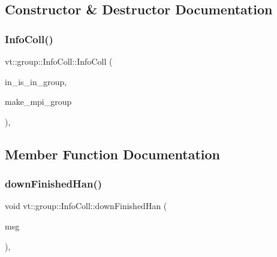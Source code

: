 \subsection{Constructor \& Destructor Documentation}
\mbox{\label{structvt_1_1group_1_1_info_coll_a289ba2942b64013eabc552e2fe362b0a}} 
\subsubsection{\texorpdfstring{Info\+Coll()}{InfoColl()}}
{\footnotesize\ttfamily vt\+::group\+::\+Info\+Coll\+::\+Info\+Coll (\begin{DoxyParamCaption}\item[{bool const}]{in\+\_\+is\+\_\+in\+\_\+group,  }\item[{bool}]{make\+\_\+mpi\+\_\+group }\end{DoxyParamCaption})\hspace{0.3cm}{\ttfamily [inline]}, {\ttfamily [explicit]}}



\subsection{Member Function Documentation}
\mbox{\label{structvt_1_1group_1_1_info_coll_ac932b886b6e0beac88966f0f0edae68a}} 
\subsubsection{\texorpdfstring{down\+Finished\+Han()}{downFinishedHan()}}
{\footnotesize\ttfamily void vt\+::group\+::\+Info\+Coll\+::down\+Finished\+Han (\begin{DoxyParamCaption}\item[{\hyperlink{namespacevt_1_1group_a864fcf6bc821eacf8350bf4ad15e51b3}{Group\+Only\+Msg} $\ast$}]{msg }\end{DoxyParamCaption})\hspace{0.3cm}{\ttfamily [static]}, {\ttfamily [protected]}}

